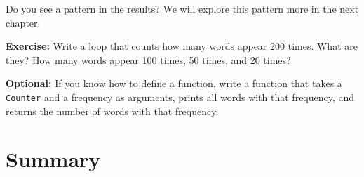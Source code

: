 Do you see a pattern in the results? We will explore this pattern more
in the next chapter.

\textbf{Exercise:} Write a loop that counts how many words appear 200
times. What are they? How many words appear 100 times, 50 times, and 20
times?

\textbf{Optional:} If you know how to define a function, write a
function that takes a \passthrough{\lstinline!Counter!} and a frequency
as arguments, prints all words with that frequency, and returns the
number of words with that frequency.

\hypertarget{summary}{%
\section{Summary}\label{summary}}

